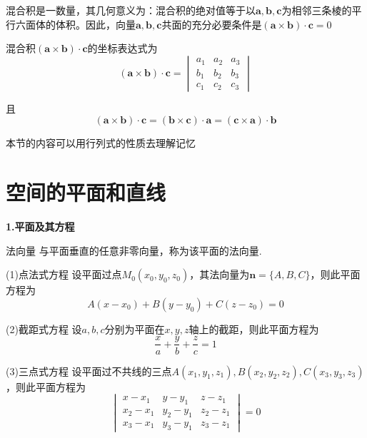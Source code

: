混合积是一数量，其几何意义为：混合积的绝对值等于以$\bm{a},\bm{b},\bm{c}$为相邻三条棱的平行六面体的体积。因此，向量$\bm{a},\bm{b},\bm{c}$共面的充分必要条件是\quad $(\bm{a}\times\bm{b})\cdot\bm{c}=0$

混合积$(\bm{a}\times\bm{b})\cdot\bm{c}$的坐标表达式为
\begin{equation}
    (\bm{a}\times\bm{b})\cdot\bm{c}=
    \begin{vmatrix}
        a_1 & a_2 & a_3 \\
        b_1 & b_2 & b_3 \\
        c_1 & c_2 & c_3
    \end{vmatrix}
    \nonumber
\end{equation}

且
\begin{equation}
    (\bm{a}\times\bm{b})\cdot\bm{c}=(\bm{b}\times\bm{c})\cdot\bm{a}=(\bm{c}\times\bm{a})\cdot\bm{b}
    \nonumber
\end{equation}

\begin{note}
本节的内容可以用行列式的性质去理解记忆
\end{note}

\section{空间的平面和直线}
\textbf{1.平面及其方程}

法向量 \quad 与平面垂直的任意非零向量，称为该平面的法向量.

(1)点法式方程 \quad 设平面过点$M_0(x_0,y_0,z_0)$，其法向量为$\bm{n}=\{A,B,C\}$，则此平面方程为
\begin{equation}
    A(x-x_0)+B(y-y_0)+C(z-z_0)=0
    \nonumber
\end{equation}

(2)截距式方程 \quad 设$a,b,c$分别为平面在$x,y,z$轴上的截距，则此平面方程为
\begin{equation}
    \frac{x}{a}+\frac{y}{b}+\frac{z}{c}=1
    \nonumber
\end{equation}

(3)三点式方程 \quad 设平面过不共线的三点$A(x_1,y_1,z_1),B(x_2,y_2,z_2),C(x_3,y_3,z_3)$，则此平面方程为
\begin{equation}
    \begin{vmatrix}
        x-x_1 & y-y_1 & z-z_1 \\
        x_2-x_1 & y_2-y_1 & z_2-z_1 \\
        x_3-x_1 & y_3-y_1 & z_3-z_1
    \end{vmatrix}=0
    \nonumber
\end{equation}

